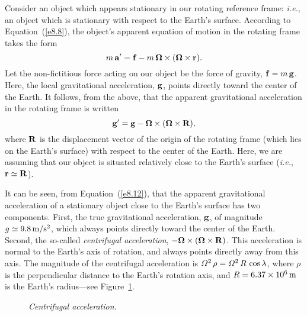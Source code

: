 Consider an object which appears stationary in our rotating reference frame:
{\em i.e.}, an object which is stationary with respect to the Earth's surface. 
According to Equation~(\ref{e8.8}), the object's apparent equation of motion in the
rotating frame takes the form
\begin{equation}
m\,{\bf a}' = {\bf f} - m\,\mbox{\boldmath$\Omega$}\times(\mbox{\boldmath$\Omega$}\times{\bf r}).
\end{equation}
Let the non-fictitious force acting on our object be the force of
gravity, ${\bf f}= m\,{\bf g}$. Here, the local gravitational acceleration, ${\bf g}$, 
points directly toward the center of the Earth. It follows, from the above,
that the apparent gravitational acceleration in the rotating frame is written
\begin{equation}\label{e8.12}
{\bf g}' = {\bf g} - \mbox{\boldmath$\Omega$}\times(\mbox{\boldmath$\Omega$}\times{\bf R}),
\end{equation}
where ${\bf R}$ is the displacement vector of the origin of the rotating
frame (which  lies on the Earth's surface) with respect to
the center of the Earth. Here, we are assuming that our object is situated
relatively close to the Earth's surface ({\em i.e.}, ${\bf r}\simeq {\bf R}$).

It can be seen, from Equation~(\ref{e8.12}), that the apparent gravitational acceleration
of a stationary object close to the Earth's surface has two components. First,
the true gravitational acceleration, ${\bf g}$, of magnitude
$g\simeq 9.8\,{\rm m/s^2}$, which always points directly toward the
center of the Earth. Second, the so-called  {\em centrifugal acceleration}, $-\mbox{\boldmath$\Omega$}\times(\mbox{\boldmath$\Omega$}\times{\bf R})$. This acceleration is normal to the Earth's axis of
rotation, and always points directly away from this axis. The magnitude
of the centrifugal acceleration is ${\mit\Omega}^2\,\rho = {\mit\Omega}^2\,R\,\cos\lambda$, where
$\rho$ is the perpendicular distance to the Earth's rotation axis, and $R=6.37\times 10^6\,{\rm m}$
is the Earth's radius---see Figure~\ref{cent}.

\begin{figure}
\epsfysize=2.5in
\centerline{}
\caption{\em Centrifugal acceleration.}\label{cent}
\end{figure}

